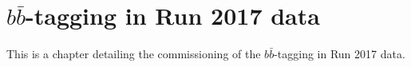 \chapter{$b\bar{b}$-tagging in Run 2017 data}
\label{chap:bbcommissioning}
This is a chapter detailing the commissioning of the $b\bar{b}$-tagging in Run 2017 data.
